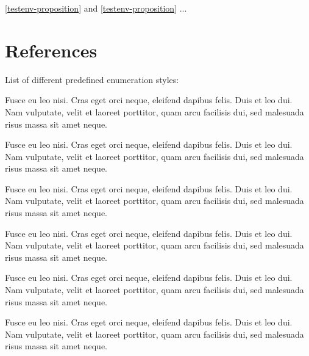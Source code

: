 \documentclass[a4paper,UKenglish,cleveref, autoref, thm-restate]{lipics-v2021}
\begin{document}
\cref{testenv-proposition} and \autoref{testenv-proposition} ...

\section{References}\label{sec:theorem-environments}

List of different predefined enumeration styles:

\begin{theorem}\label{testenv-theorem}
Fusce eu leo nisi. Cras eget orci neque, eleifend dapibus felis. Duis et leo dui. Nam vulputate, velit et laoreet porttitor, quam arcu facilisis dui, sed malesuada risus massa sit amet neque.
\end{theorem}

\begin{lemma}\label{testenv-lemma}
Fusce eu leo nisi. Cras eget orci neque, eleifend dapibus felis. Duis et leo dui. Nam vulputate, velit et laoreet porttitor, quam arcu facilisis dui, sed malesuada risus massa sit amet neque.
\end{lemma}

\begin{corollary}\label{testenv-corollary}
Fusce eu leo nisi. Cras eget orci neque, eleifend dapibus felis. Duis et leo dui. Nam vulputate, velit et laoreet porttitor, quam arcu facilisis dui, sed malesuada risus massa sit amet neque.
\end{corollary}

\begin{proposition}\label{testenv-proposition}
Fusce eu leo nisi. Cras eget orci neque, eleifend dapibus felis. Duis et leo dui. Nam vulputate, velit et laoreet porttitor, quam arcu facilisis dui, sed malesuada risus massa sit amet neque.
\end{proposition}

\begin{conjecture}\label{testenv-conjecture}
Fusce eu leo nisi. Cras eget orci neque, eleifend dapibus felis. Duis et leo dui. Nam vulputate, velit et laoreet porttitor, quam arcu facilisis dui, sed malesuada risus massa sit amet neque.
\end{conjecture}

\begin{observation}\label{testenv-observation}
Fusce eu leo nisi. Cras eget orci neque, eleifend dapibus felis. Duis et leo dui. Nam vulputate, velit et laoreet porttitor, quam arcu facilisis dui, sed malesuada risus massa sit amet neque.
\end{observation}
\end{document}
